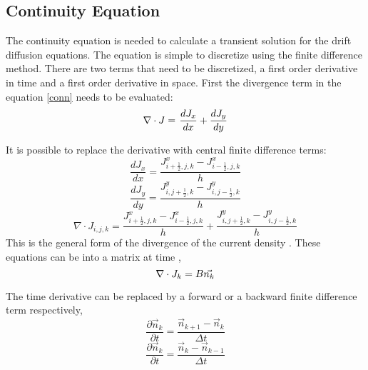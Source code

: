 \begin{doublespace}
\clearpage
\subsection{Continuity Equation}
The continuity equation is needed to calculate a transient solution for the drift diffusion equations. The equation is simple to discretize using the finite difference method. There are two terms that need to be discretized, a first order derivative in time and a first order derivative in space. First the divergence term in the equation \eqref{conn} needs to be evaluated:
\begin{equation}
\nabla \cdot J=\tjsr{\frac{\partial J}{\partial x}+\frac{\partial J}{\partial y}=}{}\frac{d J_x}{d x}+\frac{d J_y}{d y}
\end{equation}

It is possible to replace the derivative with central finite difference terms:
\begin{equation}
\frac{d J_x}{d x}=\frac{J^x_{i+\frac{1}{2},j,k}-J^x_{i-\frac{1}{2},j,k}}{h}
\end{equation}
\begin{equation}
\frac{d J_y}{d y}=\frac{J^y_{i,j+\frac{1}{2},k}-J^y_{i,j-\frac{1}{2},k}}{h}
\end{equation}
\begin{equation}
\nabla \cdot J_{i,j,k}=\frac{J^x_{i+\frac{1}{2},j,k}-J^x_{i-\frac{1}{2},j,k}}{h}+\frac{J^y_{i,j+\frac{1}{2},k}-J^y_{i,j-\frac{1}{2},k}}{h}
\label{delJ}
\end{equation}
This is the general form of the divergence of the current density . These  equations  can be  into a matrix   at time ,
\begin{equation}
\nabla \cdot J_k = B \tjs{\vec{n_k}
}\label{fd_div}
\end{equation}

The time derivative can be replaced by a forward or a backward finite difference term respectively,
\begin{equation}
\frac{\partial  \vec{n}_k}{\partial t}=\frac{ \vec{n}_{k+1}-\vec{n}_k}{\Delta t}
\label{forwardtime}
\end{equation}
\begin{equation}
\frac{\partial \vec{n}_k}{\partial t}=\frac{ \vec{n}_k- \vec{n}_{k-1}}{\Delta t}
\label{backwardtime}
\end{equation}


\end{doublespace}
